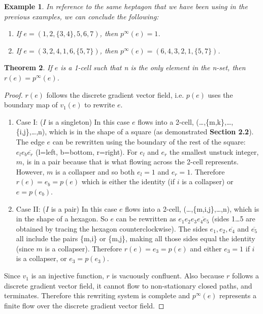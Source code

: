 \documentclass{amsart}
\newtheorem{theorem}{Theorem}[section]
\newtheorem{Example}[theorem]{Example}
\newenvironment{example}{\begin{Example}\normalfont}{\end{Example}}
\begin{document}
\begin{example}
In reference to the same heptagon that we have been using in the previous examples, we can conclude the following:
\begin{enumerate}
\item If $e=(1,2,\{3,4\},5,6,7)$, then $p^{\infty}(e)=1$.
\item If $e=(3,2,4,1,6,\{5,7\})$, then $p^{\infty}(e)=(6,4,3,2,1,\{5,7\})$.
\end{enumerate}
\end{example}

\begin{theorem}
If $e$ is a 1-cell such that n is the only element in the n-set, then $r(e)=p^{\infty}(e)$. 
\end{theorem}

\begin{proof}
$r(e)$ follows the discrete gradient vector field, i.e. $p(e)$ uses the boundary map of $v_{1}(e)$ to rewrite $e$.
\begin{enumerate}
\item Case I: ($I$ is a singleton) In this case $e$ flows into a 2-cell, (\ldots,\{m,k\},\ldots,\{i,j\},\ldots,n), which is in the shape of a square (as demonstrated \textbf{Section 2.2}). The edge $e$ can be rewritten using the boundary of the rest of the square: $e_{l}e_{b}\overline{e_{r}}$ (l=left, b=bottom, r=right). For $e_{l}$ and $e_{r}$ the smallest unstuck integer, $m$, is in a pair because that is what flowing across the 2-cell represents. However, $m$ is a collapser and so both $e_{l}=1$ and $e_{r}=1$. Therefore $r(e)=e_{b}=p(e)$ which is either the identity (if $i$ is a collapser) or $e=p(e_{b})$.
\item Case II: ($I$ is a pair) In this case $e$ flows into a 2-cell, (\ldots,\{m,i,j\},\ldots,n), which is in the shape of a hexagon. So $e$ can be rewritten as $e_{1}e_{2}e_{3}\overline{e_{4}e_{5}}$ (sides 1\ldots5 are obtained by tracing the hexagon counterclockwise). The sides $e_{1},e_{2},\overline{e_{4}}$ and $\overline{e_{5}}$ all include the pairs \{m,i\} or \{m,j\},
making all those sides equal the identity (since $m$ is a collapser). Therefore $r(e)=e_{3}=p(e)$ and either $e_{3}=1$ if $i$ is a collapser, or $e_{3}=p(e_{3})$.
\end{enumerate}
Since $v_{1}$ is an injective function, $r$ is vacuously confluent.
Also because $r$ follows a discrete gradient vector field, it cannot flow to non-stationary closed paths, and terminates. Therefore this rewriting system is complete and $p^{\infty}(e)$ represents a finite flow over the discrete gradient vector field.
\end{proof}
\end{document}
